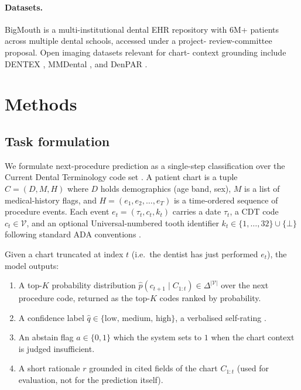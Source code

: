 \documentclass[preprint,authoryear,1p,12pt]{elsarticle}
\begin{document}
\paragraph{Datasets.} BigMouth \citep{walji2014bigmouth,
walji2022bigmouth} is a multi-institutional dental EHR repository with
6M+ patients across multiple dental schools, accessed under a project-
review-committee proposal. Open imaging datasets relevant for chart-
context grounding include DENTEX \citep{dentex2023}, MMDental
\citep{mmdental2025}, and DenPAR \citep{denpar2025}.


\section{Methods}
\label{sec:method}

\subsection{Task formulation}
\label{sec:task}

We formulate next-procedure prediction as a single-step classification
over the Current Dental Terminology code set
\citep{ada2024cdt,kalenderian2018cdt}. A patient chart is a tuple
\(C = (D, M, H)\) where \(D\) holds demographics (age band, sex), \(M\)
is a list of medical-history flags, and \(H = (e_1, e_2, \dots, e_T)\)
is a time-ordered sequence of procedure events. Each event
\(e_t = (\tau_t, c_t, k_t)\) carries a date \(\tau_t\), a CDT code
\(c_t \in \mathcal{V}\), and an optional Universal-numbered tooth
identifier \(k_t \in \{1, \dots, 32\} \cup \{\bot\}\) following standard
ADA conventions \citep{wadia2017tooth}.

Given a chart truncated at index \(t\) (i.e.\ the dentist has just
performed \(e_t\)), the model outputs:

\begin{enumerate}
    \item A top-\(K\) probability distribution
      \(\hat{p}(c_{t+1} \mid C_{1:t}) \in \Delta^{|\mathcal{V}|}\) over
      the next procedure code, returned as the top-\(K\) codes ranked by
      probability.
    \item A confidence label \(\hat{q} \in \{\text{low, medium, high}\}\),
      a verbalised self-rating
      \citep{lin2022teaching,kadavath2022know,xiong2024can}.
    \item An abstain flag \(a \in \{0, 1\}\) which the system sets to
      \(1\) when the chart context is judged insufficient.
    \item A short rationale \(r\) grounded in cited fields of the chart
      \(C_{1:t}\) (used for evaluation, not for the prediction itself).
\end{enumerate}
\end{document}
